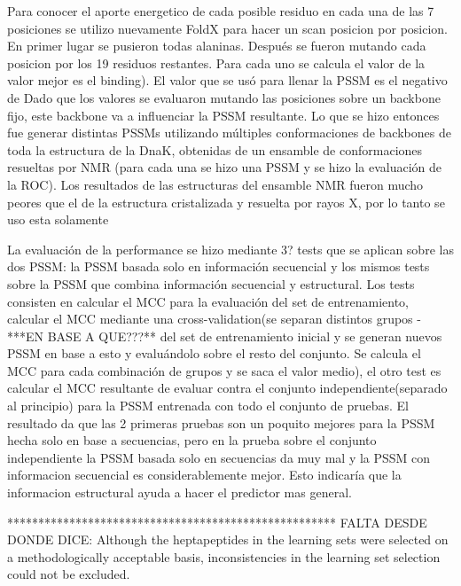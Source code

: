 Para conocer el aporte energetico de cada posible residuo en cada una de las 7
posiciones se utilizo nuevamente FoldX para hacer un scan posicion por posicion.
En primer lugar se pusieron todas alaninas. Después se fueron mutando cada
posicion por los 19 residuos restantes. Para cada uno se calcula el valor de la 
valor mejor es el binding). El valor que se usó para llenar la PSSM es el negativo de 
Dado que los valores se evaluaron mutando las posiciones sobre un backbone fijo,
este backbone va a influenciar la PSSM resultante. Lo que se hizo entonces fue
generar distintas PSSMs utilizando múltiples conformaciones de backbones de 
toda la estructura de la DnaK, obtenidas de un ensamble de conformaciones 
resueltas por NMR (para cada una se hizo una PSSM y se hizo la evaluación de 
la ROC). Los resultados de las estructuras del ensamble NMR fueron mucho peores
que el de la estructura cristalizada y resuelta por rayos X, por lo tanto se uso esta
solamente


La evaluación de la performance se hizo mediante 3? tests que se aplican sobre las dos PSSM: la PSSM basada solo en información secuencial y los mismos tests sobre la PSSM que combina información secuencial y estructural. Los tests consisten en calcular el MCC para la evaluación del set de entrenamiento, calcular el MCC mediante una cross-validation(se separan distintos grupos -***EN BASE A QUE???** del set de entrenamiento inicial y se generan nuevos PSSM en base a esto y evaluándolo sobre el resto del conjunto. Se calcula el MCC para cada combinación de grupos y se saca el valor medio), el otro test es calcular el MCC resultante de evaluar contra el conjunto independiente(separado al principio) para la PSSM entrenada con todo el conjunto de pruebas.
El resultado da que las 2 primeras pruebas son un poquito mejores para la PSSM hecha solo en base a secuencias, pero en la prueba sobre el conjunto independiente la PSSM basada solo en secuencias da muy mal y la PSSM con informacion secuencial es considerablemente mejor. Esto indicaría que la informacion estructural ayuda a hacer el predictor mas general.


*****************************************************
FALTA DESDE DONDE DICE:  Although the heptapeptides in the learning sets were selected on a methodologically acceptable basis, inconsistencies in the learning set selection could not be excluded.





